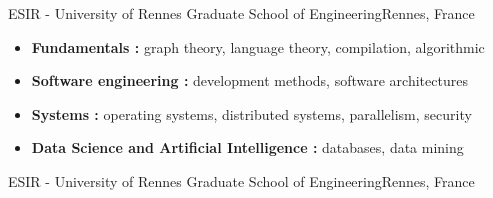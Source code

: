 
{ESIR - University of Rennes Graduate School of Engineering}{Rennes, France}{
\begin{itemize}
\item \textbf{Fundamentals :} graph theory, language theory, compilation, algorithmic
\item \textbf{Software engineering :} development methods, software architectures
\item \textbf{Systems :} operating systems, distributed systems, parallelism, security
\item \textbf{Data Science and Artificial Intelligence :} databases, data mining
\end{itemize}
}
{ESIR - University of Rennes Graduate School of Engineering}{Rennes, France}{}